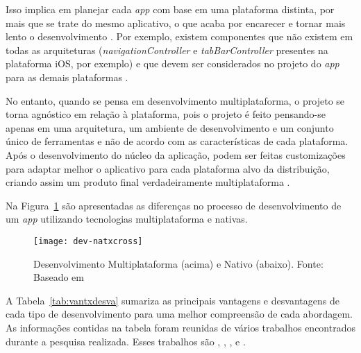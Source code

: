 Isso implica em planejar cada \textit{app} com base em uma plataforma distinta, por mais que se trate do mesmo aplicativo, o que acaba por encarecer 
e tornar mais lento o desenvolvimento \cite{kassas_taxonomy_2015}. Por exemplo, existem componentes que não existem em todas as arquiteturas (\textit{navigationController} e 
\textit{tabBarController} presentes na plataforma iOS, por exemplo) e que devem ser considerados no projeto do \textit{app} para as demais plataformas \cite{shakshuki_4th_2013}.

No entanto, quando se pensa em desenvolvimento multiplataforma, o projeto se torna agnóstico em relação à plataforma, pois o projeto é feito pensando-se 
apenas em uma arquitetura, um ambiente de desenvolvimento e um conjunto único de ferramentas e não de acordo com as características de cada plataforma. Após o desenvolvimento do núcleo da
aplicação, podem ser feitas customizações para adaptar melhor o aplicativo para cada plataforma alvo da distribuição, criando assim um produto final verdadeiramente multiplataforma \cite{corral_ant_2012}.

Na Figura~\ref{fig:dev-natxcross} são apresentadas as diferenças no processo de desenvolvimento de um \textit{app} utilizando tecnologias multiplataforma e 
nativas.

\begin{figure}[H]
  \centering
    \texttt{[image: dev-natxcross]}
    \caption[Desenvolvimento Multiplataforma (acima) e Nativo (abaixo)]{ Desenvolvimento Multiplataforma (acima) e Nativo (abaixo). Fonte: Baseado em \cite{corral_ant_2012}}
	\label{fig:dev-natxcross}
\end{figure}

A Tabela~\ref{tab:vantxdesva} sumariza as principais vantagens e desvantagens de cada tipo de desenvolvimento para uma melhor compreensão de cada abordagem. 
As informações contidas na tabela foram reunidas de vários trabalhos encontrados durante a pesquisa realizada. Esses trabalhos são , 
, ,  e . 

